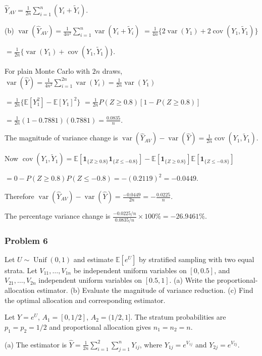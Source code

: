 $\widehat Y_{AV}=\frac1{2n}\sum_{i=1}^n(Y_i+\widetilde Y_i)$.

(b)
$\operatorname{var}(\widehat Y_{AV})=\frac1{4n^2}\sum_{i=1}^n\operatorname{var}(Y_i+\widetilde Y_i)$
$=\frac1{4n}\{2\operatorname{var}(Y_1)+2\operatorname{cov}(Y_1,\widetilde Y_1)\}$

$=\frac1{2n}\{\operatorname{var}(Y_1)+\operatorname{cov}(Y_1,\widetilde Y_1)\}$.

For plain Monte Carlo with $2n$ draws,
$\operatorname{var}(\widehat Y)=\frac1{4n^2}\sum_{i=1}^{2n}\operatorname{var}(Y_i)=\frac1{2n}\operatorname{var}(Y_1)$

$=\frac1{2n}\{\mathbb{E}[Y_1^2]-\mathbb{E}[Y_1]^2\}$
$=\frac1{2n}P(Z\geq0.8)[1-P(Z\geq0.8)]$

$=\frac1{2n}(1-0.7881)(0.7881)=\frac{0.0835}{n}$.

The magnitude of variance change is
$\operatorname{var}(\widehat Y_{AV})-\operatorname{var}(\widehat Y)=\frac1{2n}\operatorname{cov}(Y_1,\widetilde Y_1)$.

Now
$\operatorname{cov}(Y_1,\widetilde Y_1)=\mathbb{E}[\mathbf1_{\{Z\geq0.8\}}\mathbf1_{\{Z\leq-0.8\}}]-\mathbb{E}[\mathbf1_{\{Z\geq0.8\}}]\mathbb{E}[\mathbf1_{\{Z\leq-0.8\}}]$

$=0-P(Z\geq0.8)P(Z\leq-0.8)=-(0.2119)^2=-0.0449$.

Therefore
$\operatorname{var}(\widehat Y_{AV})-\operatorname{var}(\widehat Y)=\frac{-0.0449}{2n}=-\frac{0.0225}{n}$.

The percentage variance change is
$\frac{-0.0225/n}{0.0835/n}\times100\%=-26.9461\%$.

\subsubsection*{Problem 6}

 Let $U\sim\operatorname{Unif}(0,1)$ and estimate $\mathbb{E}[e^U]$ by stratified sampling with two equal strata. Let $V_{11},\ldots,V_{1n}$ be independent uniform variables on $[0,0.5]$, and $V_{21},\ldots,V_{2n}$ independent uniform variables on $[0.5,1]$. (a) Write the proportional-allocation estimator. (b) Evaluate the magnitude of variance reduction. (c) Find the optimal allocation and corresponding estimator.

 Let $Y=e^U$, $A_1=[0,1/2]$, $A_2=(1/2,1]$. The stratum probabilities are $p_1=p_2=1/2$ and proportional allocation gives $n_1=n_2=n$.

(a) The estimator is
$\widehat Y=\frac1{2n}\sum_{i=1}^2\sum_{j=1}^nY_{ij}$,
where $Y_{1j}=e^{V_{1j}}$ and $Y_{2j}=e^{V_{2j}}$.

